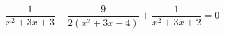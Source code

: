 \begin{ex}[type=equation]
	\begin{condition}
		$\dfrac{1}{x^2 + 3x + 3}- \dfrac{9}{2\left(x^2 + 3x +4\right)} + \dfrac{1}{x^2 + 3x + 2} = 0$
	\end{condition}
\end{ex}